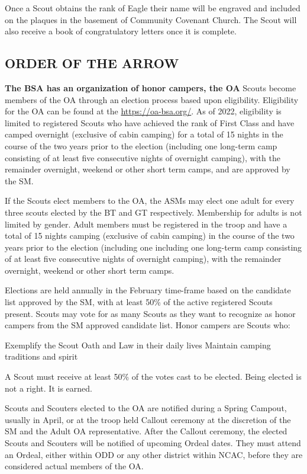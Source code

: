 \documentclass{ltxguide}
\begin{document}
Once a Scout obtains the rank of Eagle their name will be engraved and included on the plaques in the basement of Community Covenant Church. The Scout will also receive a book of congratulatory letters once it is complete.

\subsection{ORDER OF THE ARROW}
\textbf{The \ac{BSA} has an organization of honor campers, the \ac{OA}}
Scouts become members of the \ac{OA} through an election process based upon eligibility. Eligibility for the \ac{OA} can be found at the \url{https://oa-bsa.org/}. As of 2022, eligibility is limited to registered Scouts who have achieved the rank of First Class and have camped overnight (exclusive of cabin camping) for a total of 15 nights in the course of the two years prior to the election (including one long-term camp consisting of at least five consecutive nights of overnight camping), with the remainder overnight, weekend or other short term camps, and are approved by the \ac{SM}.

If the Scouts elect members to the \ac{OA}, the \acp{ASM} may elect one adult for every three scouts elected by the \ac{BT} and \ac{GT} respectively. Membership for adults is not limited by gender. Adult members must be registered in the troop and have a total of 15 nights camping (exclusive of cabin camping) in the course of the two years prior to the election (including one including one long-term camp consisting of at least five consecutive nights of overnight camping), with the remainder overnight, weekend or other short term camps.

Elections are held annually in the February time-frame based on the candidate list approved by the \ac{SM}, with at least 50\% of the active registered Scouts present. Scouts may vote for as many Scouts as they want to recognize as honor campers from the \ac{SM} approved candidate list. Honor campers are Scouts who:

Exemplify the Scout Oath and Law in their daily lives
Maintain camping traditions and spirit

A Scout must receive at least 50\% of the votes cast to be elected. Being elected is not a right. It is earned.

Scouts and Scouters elected to the OA are notified during a Spring Campout, usually in April, or at the troop held Callout ceremony at the discretion of the \ac{SM} and the Adult OA representative. After the Callout ceremony, the elected Scouts and Scouters will be notified of upcoming Ordeal dates. They must attend an Ordeal, either within \ac{ODD} or any other district within NCAC, before they are considered actual members of the OA. 
\end{document}
